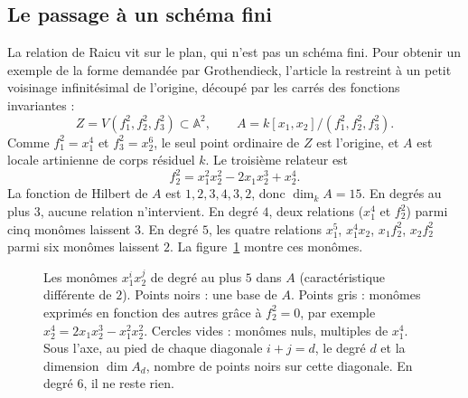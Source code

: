 \documentclass[11pt,a4paper]{amsart}
\theoremstyle{definition}
\theoremstyle{plain}
\theoremstyle{remark}
\newcommand{\A}{\mathbb A}
\begin{document}
\subsection{Le passage à un schéma fini}

La relation de Raicu vit sur le plan, qui n'est pas un schéma fini. Pour obtenir un exemple de la forme demandée par Grothendieck, l'article la restreint à un petit voisinage infinitésimal de l'origine, découpé par les carrés des fonctions invariantes :
\[
Z = V(f_1^2, f_2^2, f_3^2) \subset \A^2, \qquad A = k[x_1, x_2]/(f_1^2, f_2^2, f_3^2).
\]
Comme $f_1^2 = x_1^4$ et $f_3^2 = x_2^6$, le seul point ordinaire de $Z$ est l'origine, et $A$ est locale artinienne de corps résiduel $k$. Le troisième relateur est
\[
f_2^2 = x_1^2x_2^2 - 2x_1x_2^3 + x_2^4.
\]
La fonction de Hilbert de $A$ est $1, 2, 3, 4, 3, 2$, donc $\dim_k A = 15$. En degrés au plus $3$, aucune relation n'intervient. En degré $4$, deux relations ($x_1^4$ et $f_2^2$) parmi cinq monômes laissent $3$. En degré $5$, les quatre relations $x_1^5$, $x_1^4x_2$, $x_1f_2^2$, $x_2f_2^2$ parmi six monômes laissent $2$. La figure~\ref{fig:monomes} montre ces monômes.

\begin{figure}[htbp]
\centering
{}
\caption{Les monômes $x_1^ix_2^j$ de degré au plus $5$ dans $A$ (caractéristique différente de $2$). Points noirs : une base de $A$. Points gris : monômes exprimés en fonction des autres grâce à $f_2^2 = 0$, par exemple $x_2^4 = 2x_1x_2^3 - x_1^2x_2^2$. Cercles vides : monômes nuls, multiples de $x_1^4$. Sous l'axe, au pied de chaque diagonale $i + j = d$, le degré $d$ et la dimension $\dim A_d$, nombre de points noirs sur cette diagonale. En degré $6$, il ne reste rien.}\label{fig:monomes}
\end{figure}
\end{document}
